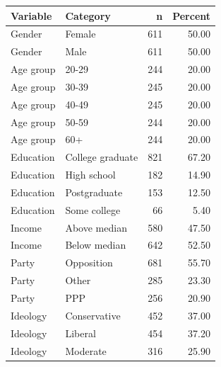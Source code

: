 \begin{tabular}{llrr}
  \toprule
Variable & Category & n & Percent \\ 
  \midrule
Gender & Female & 611 & 50.00 \\ 
  Gender & Male & 611 & 50.00 \\ 
  Age group & 20-29 & 244 & 20.00 \\ 
  Age group & 30-39 & 245 & 20.00 \\ 
  Age group & 40-49 & 245 & 20.00 \\ 
  Age group & 50-59 & 244 & 20.00 \\ 
  Age group & 60+ & 244 & 20.00 \\ 
  Education & College graduate & 821 & 67.20 \\ 
  Education & High school & 182 & 14.90 \\ 
  Education & Postgraduate & 153 & 12.50 \\ 
  Education & Some college &  66 & 5.40 \\ 
  Income & Above median & 580 & 47.50 \\ 
  Income & Below median & 642 & 52.50 \\ 
  Party & Opposition & 681 & 55.70 \\ 
  Party & Other & 285 & 23.30 \\ 
  Party & PPP & 256 & 20.90 \\ 
  Ideology & Conservative & 452 & 37.00 \\ 
  Ideology & Liberal & 454 & 37.20 \\ 
  Ideology & Moderate & 316 & 25.90 \\ 
   \bottomrule
\end{tabular}
